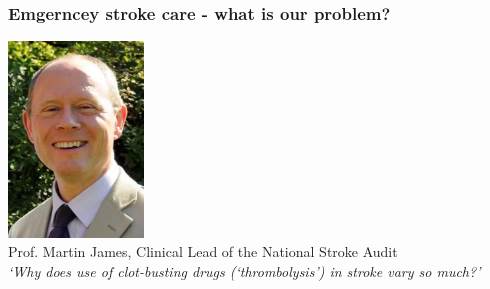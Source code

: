 \begin{frame}
\frametitle{Emgerncey stroke care - what is our problem?}

\begin{center}
\includegraphics[width=0.27\textwidth]{./images/martin_james}
\\
\small{Prof. Martin James, Clinical Lead of the National Stroke Audit}\\


\vspace{3mm}
\Large
\textit{`Why does use of clot-busting drugs (\textit{`thrombolysis'}) in stroke vary so much?'}

\end{center}   

\end{frame}